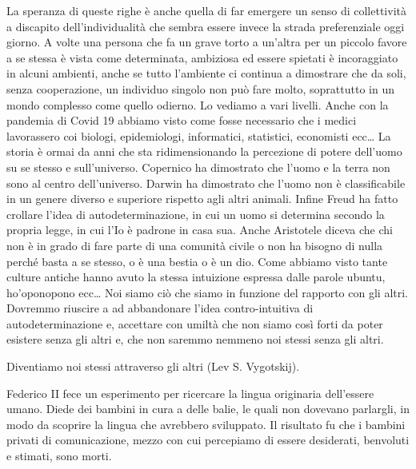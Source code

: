 \documentclass[12pt]{book} %
\begin{document}
\bigskip

La speranza di queste righe è anche quella di far emergere un senso di collettività a discapito
dell'individualità che sembra essere invece la strada preferenziale oggi giorno. A volte una
persona che fa un grave torto a un'altra per un piccolo favore a se stessa è vista come
determinata, ambiziosa ed essere spietati è incoraggiato in alcuni ambienti, anche se tutto
l'ambiente ci continua a dimostrare che da soli, senza cooperazione, un individuo singolo non può
fare molto, soprattutto in un mondo complesso come quello odierno. Lo vediamo a vari livelli. Anche con la pandemia di
Covid 19 abbiamo visto come fosse necessario che i medici lavorassero coi biologi, epidemiologi, informatici,
statistici, economisti ecc… La storia è ormai da anni che sta ridimensionando la percezione di potere
dell'uomo su se stesso e sull'universo. Copernico ha dimostrato che
l'uomo e la terra non sono al centro dell'universo. Darwin ha dimostrato che
l'uomo non è classificabile in un genere diverso e superiore rispetto agli altri animali. Infine
Freud ha fatto crollare l'idea di autodeterminazione, in cui un uomo si determina secondo la
propria legge, in cui l'Io è padrone in casa sua. Anche Aristotele diceva che chi non è in grado
di fare parte di una comunità civile o non ha bisogno di nulla perché basta a se stesso, o è una bestia o è un dio.
Come abbiamo visto tante culture antiche hanno avuto la stessa intuizione espressa dalle parole ubuntu,
ho'oponopono ecc… Noi siamo ciò che siamo in funzione del rapporto con gli altri. Dovremmo
riuscire a ad abbandonare l'idea contro-intuitiva di autodeterminazione e, accettare con umiltà
che non siamo così forti da poter esistere senza gli altri e, che non saremmo nemmeno noi stessi senza gli altri.


\bigskip

Diventiamo noi stessi attraverso gli altri (Lev S. Vygotskij). 


\bigskip
\begin{mdframed}[linewidth=1pt]
Federico II fece un esperimento per ricercare la lingua originaria dell'essere umano. Diede dei
bambini in cura a delle balie, le quali non dovevano parlargli, in modo da scoprire la lingua che avrebbero sviluppato.
Il risultato fu che i bambini privati di comunicazione, mezzo con cui percepiamo di essere desiderati, benvoluti e
stimati, sono morti.
\end{mdframed}
\end{document}
